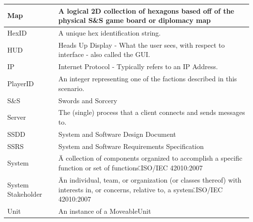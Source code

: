 \documentclass[12pt,a4paper,titlepage]{article}
\begin{document}
{\begin{center}
\begin{tabularx}{\linewidth}{|p{1.5in}|X|}
\hline
Map & A logical 2D collection of hexagons based off of the physical S\&S game board or diplomacy map\\
\hline
HexID & A unique hex identification string.\\
\hline
HUD & Heads Up Display - What the user sees, with respect to interface - also called the GUI.\\
\hline
IP & Internet Protocol - Typically refers to an IP Address.\\
\hline
PlayerID & An integer representing one of the factions described in this scenario.\\
\hline
S\&S & Swords and Sorcery\\
\hline
Server & The (single) process that a client connects and sends messages to. \\
\hline
SSDD & System and Software Design Document\\
\hline
SSRS & System and Software Requirements Specification\\
\hline
System & \"A collection of components organized to accomplish a specific function or set of functions.\"\space ISO/IEC 42010:2007\\
\hline
System Stakeholder & \"An individual, team, or organization (or classes thereof) with interests in, or concerns, relative to, a system.\"\space ISO/IEC 42010:2007\\
\hline
Unit & An instance of a MoveableUnit\\
\hline
\end{tabularx}
\end{center}
}
\end{document}
